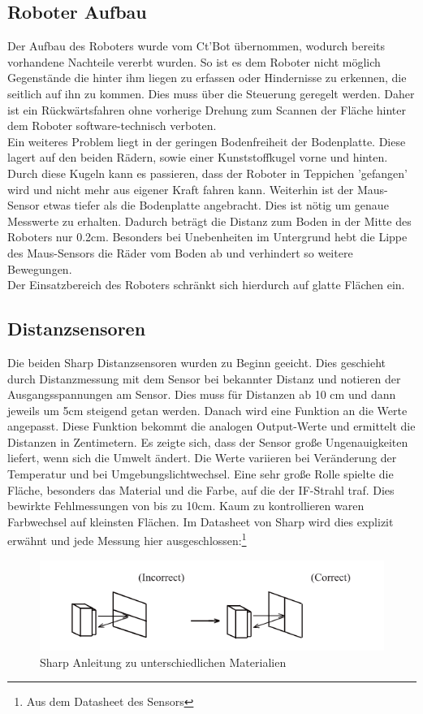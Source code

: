 \documentclass[twoside,11pt, a4paper]{report}
\begin{document}
	\subsection{Roboter Aufbau}
	Der Aufbau des Roboters wurde vom Ct'Bot übernommen, wodurch bereits vorhandene Nachteile vererbt wurden. So ist es dem Roboter nicht möglich Gegenstände die hinter ihm liegen zu erfassen oder Hindernisse zu erkennen, die seitlich auf ihn zu kommen. Dies muss über die Steuerung geregelt werden. Daher ist ein Rückwärtsfahren ohne vorherige Drehung zum Scannen der Fläche hinter dem Roboter software-technisch verboten. \\
	Ein weiteres Problem liegt in der geringen Bodenfreiheit der Bodenplatte. Diese lagert auf den beiden Rädern, sowie einer Kunststoffkugel vorne und hinten. Durch diese Kugeln kann es passieren, dass der Roboter in Teppichen 'gefangen' wird und nicht mehr aus eigener Kraft fahren kann. Weiterhin ist der Maus-Sensor etwas tiefer als die Bodenplatte angebracht. Dies ist nötig um genaue Messwerte zu erhalten. Dadurch beträgt die Distanz zum Boden in der Mitte des Roboters nur 0.2cm. Besonders bei Unebenheiten im Untergrund hebt die Lippe des Maus-Sensors die Räder vom Boden ab und verhindert so weitere Bewegungen. \\
	Der Einsatzbereich des Roboters schränkt sich hierdurch auf glatte Flächen ein. 
	
	\subsection{Distanzsensoren}
	Die beiden Sharp Distanzsensoren wurden zu Beginn geeicht. Dies geschieht durch Distanzmessung  mit dem Sensor bei bekannter Distanz und notieren der Ausgangsspannungen am Sensor. Dies muss für Distanzen ab 10 cm und dann jeweils um 5cm steigend getan werden. Danach wird eine Funktion an die Werte angepasst. Diese Funktion bekommt die analogen Output-Werte und ermittelt die Distanzen in Zentimetern. Es zeigte sich, dass der Sensor große Ungenauigkeiten liefert, wenn sich die Umwelt ändert. Die Werte variieren bei Veränderung der Temperatur und bei Umgebungslichtwechsel. Eine sehr große Rolle spielte die Fläche, besonders das Material und die Farbe, auf die der IF-Strahl traf. Dies bewirkte Fehlmessungen von bis zu 10cm. Kaum zu kontrollieren waren Farbwechsel auf kleinsten Flächen. Im Datasheet von Sharp wird dies explizit erwähnt und jede Messung hier ausgeschlossen:\footnote{Aus dem Datasheet des Sensors} 
	\begin{figure}[!htb]
		\centering
		\includegraphics[scale=0.5]{images/sharp2.png}
		\caption{Sharp Anleitung zu unterschiedlichen Materialien}
	\end{figure}
	
\end{document}
